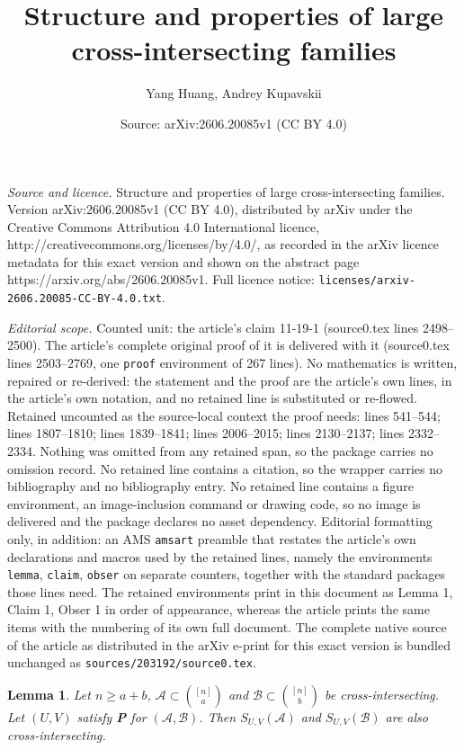 \documentclass[10pt,a4paper]{amsart}
\title{Structure and properties of large cross-intersecting families}
\author{Yang Huang, Andrey Kupavskii}
\date{Source: arXiv:2606.20085v1 (CC BY 4.0)}
\newtheorem{lemma}{Lemma}
\newcommand{\m}{\mathcal}
\begin{document}
\maketitle

\noindent\emph{Source and licence.} Structure and properties of large cross-intersecting families. Version arXiv:2606.20085v1 (CC BY 4.0), distributed by arXiv under the Creative Commons Attribution 4.0 International licence, http://creativecommons.org/licenses/by/4.0/, as recorded in the arXiv licence metadata for this exact version and shown on the abstract page https://arxiv.org/abs/2606.20085v1. Full licence notice: \texttt{licenses/arxiv-2606.20085-CC-BY-4.0.txt}.\par\smallskip

\noindent\textit{Editorial scope.} Counted unit: the article's claim 11-19-1 (source0.tex lines 2498--2500). The article's complete original proof of it is delivered with it (source0.tex lines 2503--2769, one \texttt{proof} environment of 267 lines). No mathematics is written, repaired or re-derived: the statement and the proof are the article's own lines, in the article's own notation, and no retained line is substituted or re-flowed.  Retained uncounted as the source-local context the proof needs: lines 541--544; lines 1807--1810; lines 1839--1841; lines 2006--2015; lines 2130--2137; lines 2332--2334.  Nothing was omitted from any retained span, so the package carries no omission record.  No retained line contains a citation, so the wrapper carries no bibliography and no bibliography entry.  No retained line contains a figure environment, an image-inclusion command or drawing code, so no image is delivered and the package declares no asset dependency.  Editorial formatting only, in addition: an AMS \texttt{amsart} preamble that restates the article's own declarations and macros used by the retained lines, namely the environments \texttt{lemma}, \texttt{claim}, \texttt{obser} on separate counters, together with the standard packages those lines need.  The retained environments print in this document as Lemma 1, Claim 1, Obser 1 in order of appearance, whereas the article prints the same items with the numbering of its own full document.  The complete native source of the article as distributed in the arXiv e-print for this exact version is bundled unchanged as \texttt{sources/203192/source0.tex}.
\begin{lemma}\label{SUV}
Let $n\ge a+b$, \(\mathcal{A}\subset {[n]\choose a}\) and \(\mathcal{B}\subset {[n]\choose b}\) be cross-intersecting.
Let $(U,V)$ satisfy {\bf P} for $(\m A, \m B)$. Then \(S_{U,V}(\mathcal{A})\) and \(S_{U,V}(\mathcal{B})\) are also cross-intersecting.
\end{lemma}
\end{document}
